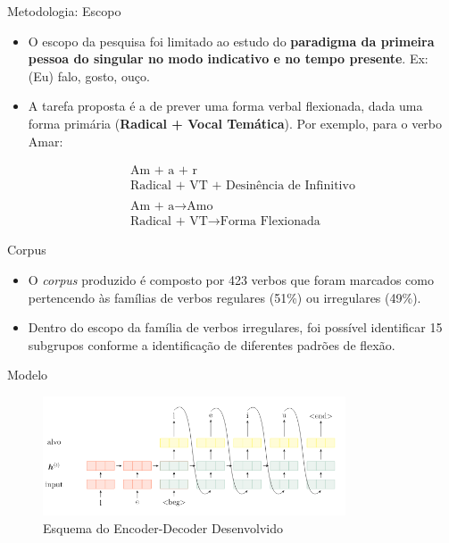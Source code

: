 \begin{frame}{Metodologia: Escopo}

\begin{itemize}
    \item<1->O escopo da pesquisa foi limitado ao estudo do \textbf{paradigma da primeira pessoa do singular no modo indicativo e no tempo presente}. Ex: (Eu) falo, gosto, ouço. \\
    \item<2->A tarefa proposta é a de prever uma forma verbal flexionada, dada uma forma primária (\textbf{Radical + Vocal Temática}). Por exemplo, para o verbo Amar:
    
    \begin{align*}
    \text{Am + a + r}\\
    \text{Radical + VT + Desinência de Infinitivo}\\\\ 
    \text{Am + a} \rightarrow \text{Amo} \\
    \text{Radical + VT} \rightarrow \text{Forma Flexionada}
\end{align*}
    
\end{itemize}

\end{frame}

\begin{frame}{Corpus}
\begin{itemize}
    \item<1->O \textit{corpus} produzido é composto por 423 verbos que foram marcados como pertencendo às famílias de verbos regulares (51\%) ou irregulares (49\%).
    \item<2->Dentro do escopo da família de verbos irregulares, foi possível identificar 15 subgrupos conforme a identificação de diferentes padrões de flexão.
\end{itemize}
\end{frame}

\begin{frame}{Modelo}

\begin{figure}
    \centering
    \includegraphics[width=0.8\textwidth]{images/metodologia/modelo.png}
    \caption{Esquema do Encoder-Decoder Desenvolvido}
    \label{fig:modelo}
\end{figure}

\end{frame}

